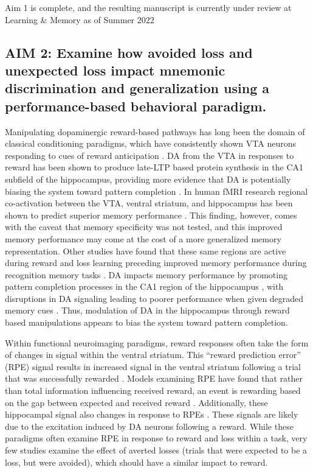 \documentclass[11pt]{article}
\providecommand\citep{\cite}
\begin{document}
Aim 1 is complete, and the resulting manuscript is currently under review at Learning
\& Memory as of Summer 2022
\subsection*{AIM 2: Examine how avoided loss and unexpected loss impact mnemonic
    discrimination and generalization using a performance-based behavioral paradigm.}
Manipulating dopaminergic reward-based pathways has long been the domain of
classical conditioning paradigms, which have consistently shown VTA neurons responding
to cues of reward anticipation \citep{fiorillo_discrete_2003}. DA from the VTA in
responses to reward has been shown to produce late-LTP based protein synthesis in the
CA1 subfield of the hippocampus, providing more evidence that DA is potentially biasing
the system toward pattern completion \citep{huang_lateltp_1995}. In human fMRI research
regional co-activation between the VTA, ventral striatum, and hippocampus has been shown
to predict superior memory performance \citep{adcock_reward-motivated_2006}. This
finding, however, comes with the caveat that memory specificity was not tested, and this
improved memory performance may come at the cost of a more generalized memory
representation. Other studies have found that these same regions are active during
reward and loss learning preceding improved memory performance during recognition memory
tasks \citep{shigemune_remembering_2014}. DA impacts memory performance by promoting
pattern completion processes in the CA1 region of the hippocampus
\citep{kempadoo_dopamine_2016}, with disruptions in DA signaling leading to poorer
performance when given degraded memory cues \citep{li_balanced_2010}. Thus, modulation
of DA in the hippocampus through reward based manipulations appears to bias the system
toward pattern completion. \par

Within functional neuroimaging paradigms, reward responses often take the form of
changes in signal within the ventral striatum. This ``reward prediction error'' (RPE)
signal results in increased signal in the ventral striatum following a trial that was
successfully rewarded \citep{schultz_reward_1997,daw_rewardprediction_2011}. Models
examining RPE have found that rather than total information influencing received reward,
an event is rewarding based on the gap between expected and received reward
\citep{marvin_curiosity_2016}. Additionally, these hippocampal signal also changes in
response to RPEs \citep{davidow_upside_2016}. These signals are likely due to the
excitation induced by DA neurons following a reward. While these paradigms often examine
RPE in response to reward and loss within a task, very few studies examine the effect of
averted losses (trials that were expected to be a loss, but were avoided), which should
have a similar impact to reward. \par
\end{document}
